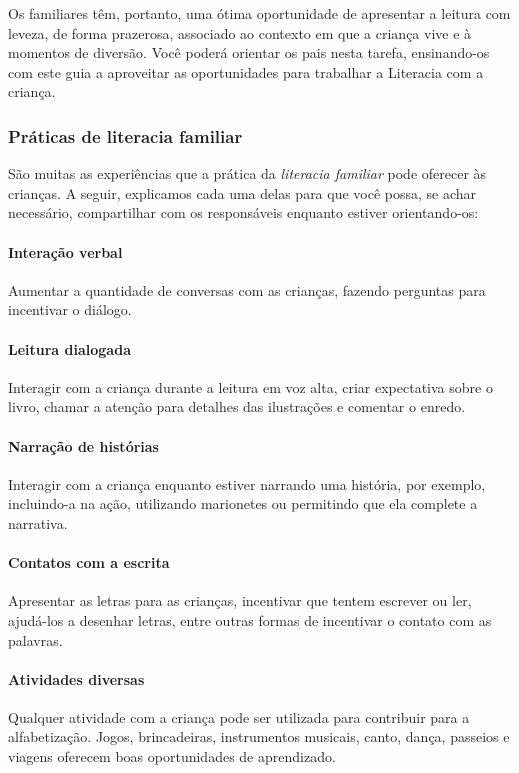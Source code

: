 \documentclass[11pt]{extarticle}
\begin{document}
Os familiares têm, 
portanto, uma ótima oportunidade de apresentar a leitura com leveza, de forma 
prazerosa, associado ao contexto em que a criança vive e à momentos de diversão. 
Você poderá orientar os pais nesta tarefa, ensinando-os com este guia a aproveitar 
as oportunidades para trabalhar a Literacia com a criança.


\subsubsection{Práticas de literacia familiar} 

São muitas as experiências que a prática da \textit{literacia familiar} 
pode oferecer às crianças. A seguir, explicamos cada uma delas para que você possa, 
se achar necessário, compartilhar com os responsáveis enquanto estiver orientando-os: 

\paragraph{Interação verbal} Aumentar a quantidade de conversas com as 
crianças, fazendo perguntas para incentivar o diálogo.

\paragraph{Leitura dialogada} Interagir com a criança durante a leitura 
em voz alta, criar expectativa sobre o livro, chamar a atenção para detalhes 
das ilustrações e comentar o enredo.

\paragraph{Narração de histórias} Interagir com a criança enquanto 
estiver narrando uma história, por exemplo, incluindo-a na ação, utilizando 
marionetes ou permitindo que ela complete a narrativa.

\paragraph{Contatos com a escrita} Apresentar as letras para as 
crianças, incentivar que tentem escrever ou ler, ajudá-los a desenhar letras, 
entre outras formas de incentivar o contato com as palavras.

\paragraph{Atividades diversas} Qualquer atividade com a criança 
pode ser utilizada para contribuir para a alfabetização. Jogos, brincadeiras, 
instrumentos musicais, canto, dança, passeios e viagens oferecem boas 
oportunidades de aprendizado.
\end{document}
